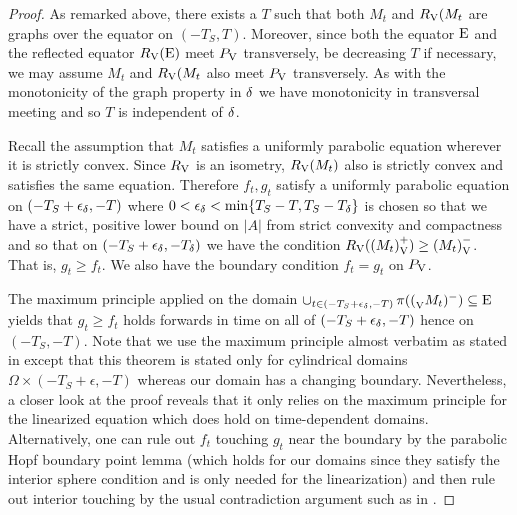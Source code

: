 \documentclass{amsart}
\begin{document}
\begin{proof}
As remarked above, there exists a \(T\) such that both \(M_t\) and \(R_{\operatorname{V}}(M_t\) are graphs over the equator on \((-T_S, T)\). Moreover, since both the equator \(\operatorname{E}\) and the reflected equator \(R_{\operatorname{V}}(\operatorname{E})\) meet \(P_{\operatorname{V}}\) transversely, be decreasing \(T\) if necessary, we may assume \(M_t\) and \(R_{\operatorname{V}}(M_t\) also meet \(P_{\operatorname{V}}\) transversely. As with the monotonicity of the graph property in \(\operatorname{\delta}\) we have monotonicity in transversal meeting and so \(T\) is independent of \(\operatorname{\delta}\).

Recall the assumption that \(M_t\) satisfies a uniformly parabolic equation wherever it is strictly convex. Since \(R_{\operatorname{V}}\) is an isometry, \(R_{\operatorname{V}}(M_t)\) also is strictly convex and satisfies the same equation. Therefore \(f_t,g_t\) satisfy a uniformly parabolic equation on \((-T_S + \epsilon_{\operatorname{\delta}}, -T)\) where \(0 < \epsilon_{\operatorname{\delta}} < \min\{T_S-T, T_S-T_{\operatorname{\delta}}\}\) is chosen so that we have a strict, positive lower bound on \(|A|\) from strict convexity and compactness and so that on \((-T_S + \epsilon_{\operatorname{\delta}}, -T_{\operatorname{\delta}})\) we have the condition \(R_{\operatorname{V}}({(M_t)}_{\operatorname{V}}^+) \geq {(M_t)}_{\operatorname{V}}^-\). That is, \(g_t \geq f_t\). We also have the boundary condition \(f_t = g_t\) on \(P_{\operatorname{V}}\).

The maximum principle applied on the domain \(\operatorname{\cup}\limits_{t \in (-T_S + \epsilon_{\operatorname{\delta}}, -T)} \operatorname{\pi}({(}_{\operatorname{V}}M_t)^-) \subseteq \operatorname{E}\) yields that \(g_t \geq f_t\) holds forwards in time on all of \((-T_S + \epsilon_{\operatorname{\delta}}, -T)\) hence on \((-T_S, -T)\). Note that we use the maximum principle almost verbatim as stated in \cite[3.7, Theorem 12]{MR762825} except that this theorem is stated only for cylindrical domains \(\Omega \times (-T_S + \epsilon, -T)\) whereas our domain has a changing boundary. Nevertheless, a closer look at the proof reveals that it only relies on the maximum principle for the linearized equation \cite[3.3, Theorem 7, remark (ii)]{MR762825} which does hold on time-dependent domains. Alternatively, one can rule out \(f_t\) touching \(g_t\) near the boundary by the parabolic Hopf boundary point lemma \cite[3.3, Theorem 6]{MR762825} (which holds for our domains since they satisfy the interior sphere condition and is only needed for the linearization) and then rule out interior touching by the usual contradiction argument such as in \cite[3.2 Lemma]{MR837523}.
\end{proof}
\end{document}
